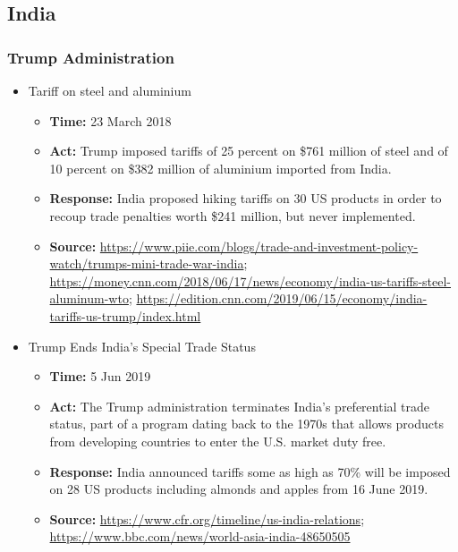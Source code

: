 	\subsection{India}
		\subsubsection{Trump Administration}
			\begin{itemize}
			\item Tariff on steel and aluminium
				\begin{itemize}
				\item \textbf{Time: }23 March 2018
				\item \textbf{Act: }Trump imposed tariffs of 25 percent on \$761 million of steel and of 10 percent on \$382 million of aluminium imported from India.
				\item \textbf{Response: }India proposed hiking tariffs on 30 US products in order to recoup trade penalties worth \$241 million, but never implemented.
				\item	\textbf{Source: }\url{https://www.piie.com/blogs/trade-and-investment-policy-watch/trumps-mini-trade-war-india}; \url{https://money.cnn.com/2018/06/17/news/economy/india-us-tariffs-steel-aluminum-wto}; \url{https://edition.cnn.com/2019/06/15/economy/india-tariffs-us-trump/index.html}
				\end{itemize}

			\item	Trump Ends India’s Special Trade Status
				\begin{itemize}
				\item \textbf{Time: }5 Jun 2019
				\item \textbf{Act: }The Trump administration terminates India’s preferential trade status, part of a program dating back to the 1970s that allows products from developing countries to enter the U.S. market duty free.
				\item \textbf{Response: }India announced tariffs some as high as 70\% will be imposed on 28 US products including almonds and apples from 16 June 2019.
				\item	\textbf{Source: }\url{https://www.cfr.org/timeline/us-india-relations}; \url{https://www.bbc.com/news/world-asia-india-48650505}
				\end{itemize}

			\end{itemize}
			
